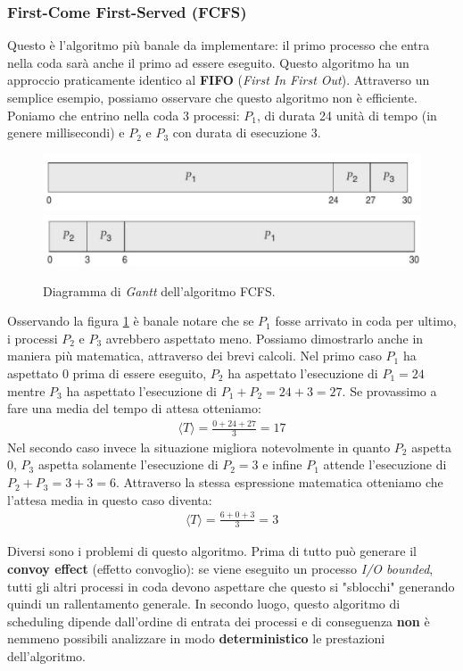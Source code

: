 \subsubsection{First-Come First-Served (FCFS)}
Questo è l'algoritmo più banale da implementare: il primo processo che entra nella coda sarà anche il primo ad essere eseguito. Questo algoritmo ha un approccio praticamente identico al \textbf{FIFO} (\textit{First In First Out}). Attraverso un semplice esempio, possiamo osservare che questo algoritmo non è efficiente. Poniamo che entrino nella coda 3 processi: $P_1$, di durata 24 unità di tempo (in genere millisecondi) e $P_2$ e $P_3$ con durata di esecuzione 3.  
\begin{figure}[h]
    \centering
    \includegraphics[width = .7\textwidth]{../res/imgs/CPU scheduling/FCFS.png}
    \includegraphics[width = .7\textwidth]{../res/imgs/CPU scheduling/FCFS2.png}
    \caption{Diagramma di \textit{Gantt} dell'algoritmo FCFS.}
    \label{fig:FCFS}
\end{figure}
Osservando la figura \ref{fig:FCFS} è banale notare che se $P_1$ fosse arrivato in coda per ultimo, i processi $P_2$ e $P_3$ avrebbero aspettato meno.
Possiamo dimostrarlo anche in maniera più matematica, attraverso dei brevi calcoli. Nel primo caso $P_1$ ha aspettato 0 prima di essere eseguito, $P_2$ ha aspettato l'esecuzione di $P_1 = 24$ mentre $P_3$ ha aspettato l'esecuzione di $P_1 + P_2 = 24 + 3 = 27$. Se provassimo a fare una media del tempo di attesa otteniamo:
\begin{gather*}
    \langle T\rangle = \frac{0 + 24 + 27}{3} = 17
\end{gather*}
Nel secondo caso invece la situazione migliora notevolmente in quanto $P_2$ aspetta 0, $P_3$ aspetta solamente l'esecuzione di $P_2 = 3$ e infine $P_1$ attende l'esecuzione di $P_2 + P_3 = 3 + 3 = 6$. Attraverso la stessa espressione matematica otteniamo che l'attesa media in questo caso diventa:
\begin{gather*}
    \langle T \rangle = \frac{6 + 0 + 3}{3} = 3
\end{gather*}

Diversi sono i problemi di questo algoritmo. Prima di tutto può generare il \textbf{convoy effect} (effetto convoglio): se viene eseguito un processo \textit{I/O bounded}, tutti gli altri processi in coda devono aspettare che questo si "sblocchi" generando quindi un rallentamento generale. In secondo luogo, questo algoritmo di scheduling dipende dall'ordine di entrata dei processi e di conseguenza \textbf{non} è nemmeno possibili analizzare in modo \textbf{deterministico} le prestazioni dell'algoritmo.
% 
